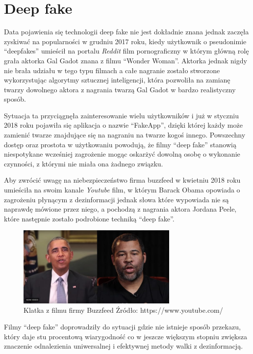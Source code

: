 \section{Deep fake}

Data pojawienia się technologii deep fake nie jest dokładnie znana jednak zaczęła zyskiwać na popularności 
w grudniu 2017 roku, kiedy użytkownik o pseudonimie ``deepfakes'' umieścił na portalu \emph{Reddit} film
pornograficzny w którym główną rolę grała aktorka Gal Gadot znana z filmu ``Wonder Woman''. Aktorka jednak 
nigdy nie brała udziału w tego typu filmach a całe nagranie zostało stworzone wykorzystując algorytmy sztucznej
inteligencji, która pozwoliła na zamianę twarzy dowolnego aktora z nagrania twarzą Gal Gadot w bardzo realistyczny sposób.

Sytuacja ta przyciągnęła zainteresowanie wielu użytkowników i już w styczniu 2018 roku pojawiła się aplikacja o nazwie
``FakeApp'', dzięki której każdy może zamienić twarze znajdujące się na nagraniu na twarze kogoś innego.
Powszechny dostęp oraz prostota w użytkowaniu powodują, że filmy ``deep fake'' stanowią niespotykane wcześniej zagrożenie
mogąc oskarżyć dowolną osobę o wykonanie czynności, z którymi nie miała ona żadnego związku. 

Aby zwrócić uwagę na niebezpieczeństwo firma buzzfeed w kwietniu 2018 roku umieściła na swoim kanale \emph{Youtube} film, w którym Barack Obama opowiada 
o zagrożeniu płynącym z dezinformacji jednak słowa które wypowiada nie są naprawdę mówione przez niego, a pochodzą
z nagrania aktora Jordana Peele, które następnie zostało podrobione techniką ``deep fake''.

\begin{figure}[h!]
    \centering
    \includegraphics[width=0.7\textwidth]{./Img/peele.jpg}
    \caption{Klatka z filmu firmy Buzzfeed Źródło: https://www.youtube.com/}
\end{figure}

Filmy ``deep fake'' doprowadziły do sytuacji gdzie nie istnieje sposób przekazu, który daje stu procentową wiarygodność
co w jeszcze większym stopniu zwiększa znaczenie odnalezienia uniwersalnej i efektywnej metody walki z dezinformacją. 